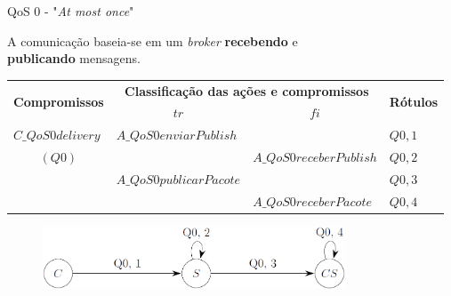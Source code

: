 \documentclass[12pt,xcolor={usenames,dvipsnames}]{beamer}
\begin{document}
\begin{frame}{QoS 0 - "\textit{At most once}"}

\begin{beamerboxesrounded}{}
	A comunicação baseia-se em um \textit{broker} \textbf{recebendo} e \\\textbf{publicando} mensagens.
\end{beamerboxesrounded}

\begin{table}[!ht]
	\centering\tiny{
		\begin{tabular}{|l|l|l|l|}
			\hline
			\multicolumn{1}{|c|}{\multirow{2}{*}{\textbf{Compromissos}}} & \multicolumn{2}{c|}{\textbf{Classificação das ações e compromissos}} & \multicolumn{1}{c|}{\multirow{2}{*}{\textbf{Rótulos}}} \\ \cline{2-3}
			\multicolumn{1}{|c|}{}                                       & \multicolumn{1}{c|}{$tr$}    & \multicolumn{1}{c|}{$fi$}    & \multicolumn{1}{c|}{}                                  \\ \hline
			$C\_QoS0delivery$                                            & $A\_QoS0enviarPublish$       &                              & $Q0,1$                                                 \\ \cline{2-4} 
			\multicolumn{1}{|c|}{$(Q0)$}                                 &                              & $A\_QoS0receberPublish$      & $Q0,2$                                                 \\ \cline{2-4} 
			& $A\_QoS0publicarPacote$      &                              & $Q0,3$                                                 \\ \cline{2-4} 
			&                              & $A\_QoS0receberPacote$       & $Q0,4$                                                 \\ \hline
		\end{tabular}
	}
\end{table}

\begin{figure}[ht]
	\centering
	\includegraphics[width=9cm]{./figuras/qos0_grafo.png}
\end{figure} 

\end{frame}
\end{document}
